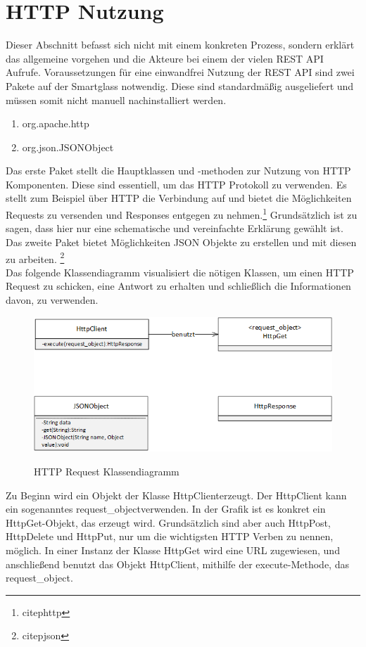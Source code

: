 \section{HTTP Nutzung}
\label{sec:httpnutzung}
Dieser Abschnitt befasst sich nicht mit einem konkreten Prozess, sondern erklärt das allgemeine vorgehen und die Akteure bei einem der vielen REST API Aufrufe. Voraussetzungen für eine einwandfrei Nutzung der REST API sind zwei Pakete auf der Smartglass notwendig. Diese sind standardmäßig ausgeliefert und müssen somit nicht manuell nachinstalliert werden.
\begin{enumerate}
	\item org.apache.http
	\item org.json.JSONObject
\end{enumerate}
Das erste Paket stellt die Hauptklassen und -methoden zur Nutzung von HTTP Komponenten. Diese sind essentiell, um das HTTP Protokoll zu verwenden. Es stellt zum Beispiel über HTTP die Verbindung auf und bietet die Möglichkeiten Requests zu versenden und Responses entgegen zu nehmen.\footnote{citep{http}} Grundsätzlich ist zu sagen, dass hier nur eine schematische und vereinfachte Erklärung gewählt ist. 
\\
Das zweite Paket bietet Möglichkeiten JSON Objekte zu erstellen und mit diesen zu arbeiten. \footnote{citep{json}}
\\
Das folgende Klassendiagramm visualisiert die nötigen Klassen, um einen HTTP Request zu schicken, eine Antwort zu erhalten und schließlich die Informationen davon, zu verwenden.
\begin{figure}[H]
	\centering
	{\includegraphics[scale=0.7]{Bilder/Abbildungen/http_request_klassendiagramm.png}}
	\caption{HTTP Request Klassendiagramm}
	\label{fig:sequenz_warenannnahme}
\end{figure}
Zu Beginn wird ein Objekt der Klasse \glqq HttpClient\grqq erzeugt. Der HttpClient kann ein sogenanntes \glqq request\_object\grqq verwenden. In der Grafik ist es konkret ein \glqq HttpGet\grqq -Objekt, das erzeugt wird. Grundsätzlich sind aber auch HttpPost, HttpDelete und HttpPut, nur um die wichtigsten HTTP Verben zu nennen, möglich. In einer Instanz der Klasse HttpGet wird eine URL zugewiesen, und anschließend benutzt das Objekt HttpClient, mithilfe der \glqq execute\grqq -Methode, das request\_object.
